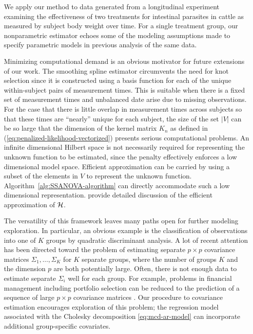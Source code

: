 \bigskip

We apply our method to data generated from a longitudinal experiment examining the effectiveness of two treatments for intestinal parasites in cattle as measured by subject body weight over time. For a single treatment group, our nonparametric estimator echoes some of the modeling assumptions made to specify parametric models in previous analysis of the same data.


\bigskip

Minimizing computational demand is an obvious motivator for future extensions of our work. The smoothing spline estimator circumvents the need for knot selection since it is constructed using a basis function for each of the unique within-subject pairs of measurement times. This is suitable when there is a fixed set of measurement times and unbalanced date arise due to missing observations. For the case that there is little overlap in measurement times across subjects so that these times are ``nearly'' unique for each subject, the size of the set $\vert V \vert $ can be so large that the dimension of the kernel matrix $K_n$ as defined in (\ref{eq:penalized-likelihood-vectorized}) presents serious computational problems. An infinite dimensional Hilbert space is not necessarily required for representing the unknown function to be estimated, since the penalty effectively enforces a low dimensional model space. Efficient approximation can be carried by using a subset of the elements in $V$ to represent the unknown function. Algorithm~\ref{alg:SSANOVA-algorithm} can directly accommodate such a low dimensional representation. \cite{kim2004smoothing} provide detailed discussion of the efficient approximation of $\mathcal{H}$.

\bigskip 

The versatility of this framework leaves many paths open for further modeling exploration. In particular, an obvious example is the classification of observations into one of $K$ groups by quadratic discriminant analysis. A lot of recent attention has been directed toward the problem of estimating separate $p\times p$ covariance matrices $\Sigma_1,\dots, \Sigma_K$ for $K$ separate groups, where the number of groups $K$ and the dimension $p$ are both potentially large. Often, there is not enough data to estimate separate $\Sigma_i$ well for each group. For example, problems in financial management including portfolio selection can be reduced to the prediction of a sequence of large $p \times p$ covariance matrices \citep{tsay2005analysis}. Our procedure to covariance estimation encourages exploration of this problem; the regression model associated with the Cholesky decomposition \eqref{eq:mcd-ar-model} can incorporate additional group-specific covariates. 

